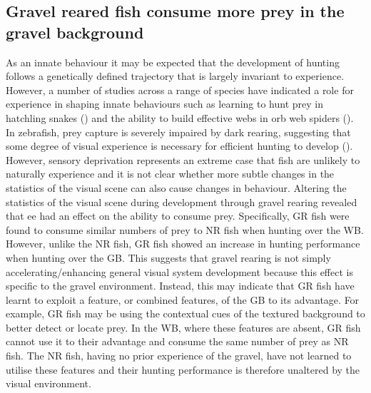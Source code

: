  \subsection{Gravel reared fish consume more prey in the gravel background}
 As an innate behaviour it may be expected that the development of hunting follows a genetically defined trajectory that is largely invariant to experience. However, a number of studies across a range of species have indicated a role for experience in shaping innate behaviours such as learning to hunt prey in hatchling snakes (\cite{Mehta2009EarlySnakes}) and the ability to build effective webs in orb web spiders (\cite{Heiling1999TheAraneidae}). In zebrafish, prey capture is severely impaired by dark rearing, suggesting that some degree of visual experience is necessary for efficient hunting to develop (\cite{Avitan2017}). However, sensory deprivation represents an extreme case that fish are unlikely to naturally experience and it is not clear whether more subtle changes in the statistics of the visual scene can also cause changes in behaviour. Altering the statistics of the visual scene during development through gravel rearing revealed that \gls{ee} had an effect on the ability to consume prey. Specifically, GR fish were found to consume similar numbers of prey to NR fish when hunting over the WB. However, unlike the NR fish, GR fish showed an increase in hunting performance when hunting over the GB. This suggests that gravel rearing is not simply accelerating/enhancing general visual system development because this effect is specific to the gravel environment.  Instead, this may indicate that GR fish have learnt to exploit a feature, or combined features, of the GB to its advantage. For example, GR fish may be using the contextual cues of the textured background to better detect or locate prey. In the WB, where these features are absent, GR fish cannot use it to their advantage and consume the same number of prey as NR fish. The NR fish, having no prior experience of the gravel, have not learned to utilise these features and their hunting performance is therefore unaltered by the visual environment.

